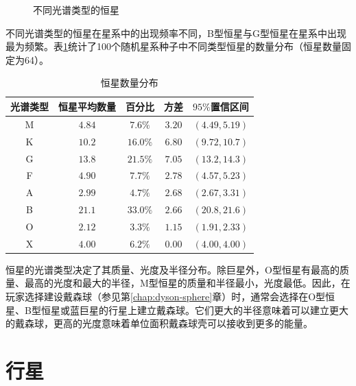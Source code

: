 \begin{figure}[htb]
    \centering
    \caption{不同光谱类型的恒星}
    \label{fig:color-dist}
\end{figure}

不同光谱类型的恒星在星系中的出现频率不同，B型恒星与G型恒星在星系中出现最为频繁。表\ref{tbl:amount-dist}统计了100个随机星系种子中不同类型恒星的数量分布（恒星数量固定为64）。

\begin{table}[h]
    \centering
    \small
    \caption{恒星数量分布}
    \begin{tabular}{ccccc}
        \toprule
        光谱类型 & 恒星平均数量 & 百分比 & 方差 & $95\%$置信区间 \\
        \midrule
        M & $4.84$ & $7.6\%$ & $3.20$ & $(4.49, 5.19)$ \\
        K & $10.2$ & $16.0\%$ & $6.80$ & $(9.72, 10.7)$ \\
        G & $13.8$ & $21.5\%$ & $7.05$ & $(13.2, 14.3)$ \\
        F & $4.90$ & $7.7\%$ & $2.78$ & $(4.57, 5.23)$ \\
        A & $2.99$ & $4.7\%$ & $2.68$ & $(2.67, 3.31)$ \\
        B & $21.1$ & $33.0\%$ & $2.66$ & $(20.8, 21.6)$ \\
        O & $2.12$ & $3.3\%$ & $1.15$ & $(1.91, 2.33)$ \\
        X & $4.00$ & $6.2\%$ & $0.00$ & $(4.00, 4.00)$ \\
        \bottomrule
    \end{tabular}
    \label{tbl:amount-dist}
\end{table}

恒星的光谱类型决定了其质量、光度及半径分布。除巨星外，O型恒星有最高的质量、最高的光度和最大的半径，M型恒星的质量和半径最小，光度最低。因此，在玩家选择建设戴森球（参见第\ref{chap:dyson-sphere}章）时，通常会选择在O型恒星、B型恒星或蓝巨星的行星上建立戴森球。它们更大的半径意味着可以建立更大的戴森球，更高的光度意味着单位面积戴森球壳可以接收到更多的能量。

\section{行星}


